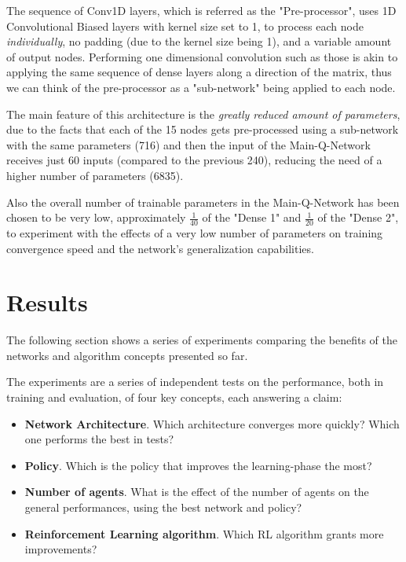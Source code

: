 \documentclass[13pt]{article}
\begin{document}
The sequence of Conv1D layers, which is referred as the "Pre-processor", uses 1D Convolutional Biased layers with kernel size set to 1, to process each node \textit{individually}, no padding (due to the kernel size being 1), and a variable amount of output nodes. Performing one dimensional convolution such as those is akin to applying the same sequence of dense layers along a direction of the matrix, thus we can think of the pre-processor as a "sub-network" being applied to each node.

The main feature of this architecture is the \textit{greatly reduced amount of parameters}, due to the facts that each of the 15 nodes gets pre-processed using a sub-network with the same parameters (716) and then the input of the Main-Q-Network receives just 60 inputs (compared to the previous 240), reducing the need of a higher number of parameters (6835).

Also the overall number of trainable parameters in the Main-Q-Network has been chosen to be very low, approximately $\frac{1}{40}$ of the "Dense 1" and $\frac{1}{20}$ of the "Dense 2", to experiment with the effects of a very low number of parameters on training convergence speed and the network's generalization capabilities.


\newpage

%
%

\section{Results}
The following section shows a series of experiments comparing the benefits of the networks and algorithm concepts presented so far.

The experiments are a series of independent tests on the performance, both in training and evaluation, of four key concepts, each answering a claim:
\begin{itemize}
    \item \textbf{Network Architecture}. Which architecture converges more quickly? Which one performs the best in tests?
    \item \textbf{Policy}. Which is the policy that improves the learning-phase the most?
    \item \textbf{Number of agents}. What is the effect of the number of agents on the general performances, using the best network and policy?
    \item \textbf{Reinforcement Learning algorithm}. Which RL algorithm grants more improvements?
\end{itemize}
\end{document}
